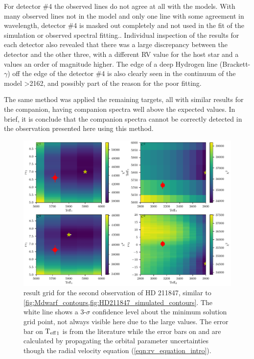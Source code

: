 For detector \#4 the observed lines do not agree at all with the models.
With many observed lines not in the model and only one line with some agreement in wavelength, detector \#4 is masked out completely and not used in the \textchisquared{} fit of the simulation or observed spectral fitting..
Individual inspection of the \textchisquared{} results for each detector also revealed that there was a large discrepancy between the  detector and the other three, with a different {RV} value for the host star and a \textchisquared{} values an order of magnitude higher.
The edge of a deep Hydrogen line (Brackett-\(\gamma\)) off the edge of the detector \#4 is also clearly seen in the continuum of the model >2162\nm{}, and possibly part of the reason for the poor fitting.

The same method was applied the remaining targets, all with similar results for the companion, having companion spectra well above the expected values.
In brief, it is conclude that the companion spectra cannot be correctly detected in the observation presented here using this method.

\begin{figure}
    \centering
    \includegraphics[width=0.7\linewidth]{figures/companion_recovery/HD211847_result_pcolors}
    \caption[\textchisquared{} contour for an observation {HD 211847}.]{\textchisquared{} result grid for the second observation of {HD 211847}, similar to \cref{fig:Mdwarf_contours,fig:HD211847_simulated_contours}.
        The white line shows a 3-\(\sigma\) confidence level about the minimum \textchisquared{} solution grid point, not always visible here due to the large \textchisquared{} values.
        The error bar on \({\textrm{T}_{\mathrm{eff}}}_{1}\) is from the literature while the error bars on \Rvone{} and \Rvtwo{} are calculated by propagating the orbital parameter uncertainties though the radial velocity equation (\cref{eqn:rv_equation_intro}).}
    \label{fig:HD211847_result_contours}
\end{figure}

